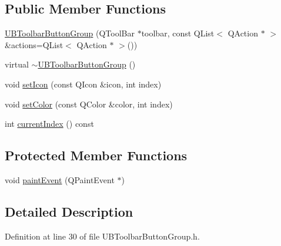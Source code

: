 \subsection*{Public Member Functions}
\begin{DoxyCompactItemize}
\item 
\hyperlink{class_u_b_toolbar_button_group_a97f7ad344c8d692022c69317ee7a2ad0}{U\-B\-Toolbar\-Button\-Group} (Q\-Tool\-Bar $\ast$toolbar, const Q\-List$<$ Q\-Action $\ast$ $>$ \&actions=Q\-List$<$ Q\-Action $\ast$ $>$())
\item 
virtual \hyperlink{class_u_b_toolbar_button_group_a82ee3f513fb22d8a78bf2f3c4c1b865d}{$\sim$\-U\-B\-Toolbar\-Button\-Group} ()
\item 
void \hyperlink{class_u_b_toolbar_button_group_a174fe9c5145d4d29a40b867cfaf8aa32}{set\-Icon} (const Q\-Icon \&icon, int index)
\item 
void \hyperlink{class_u_b_toolbar_button_group_ad6e26c61e1c563337064379a5a13217f}{set\-Color} (const Q\-Color \&color, int index)
\item 
int \hyperlink{class_u_b_toolbar_button_group_a66b7d4c87448170efd79be3a21503607}{current\-Index} () const 
\end{DoxyCompactItemize}
\subsection*{Protected Member Functions}
\begin{DoxyCompactItemize}
\item 
void \hyperlink{class_u_b_toolbar_button_group_a65f4a5c9075be47cee185cad2367edbe}{paint\-Event} (Q\-Paint\-Event $\ast$)
\end{DoxyCompactItemize}


\subsection{Detailed Description}


Definition at line 30 of file U\-B\-Toolbar\-Button\-Group.\-h.



